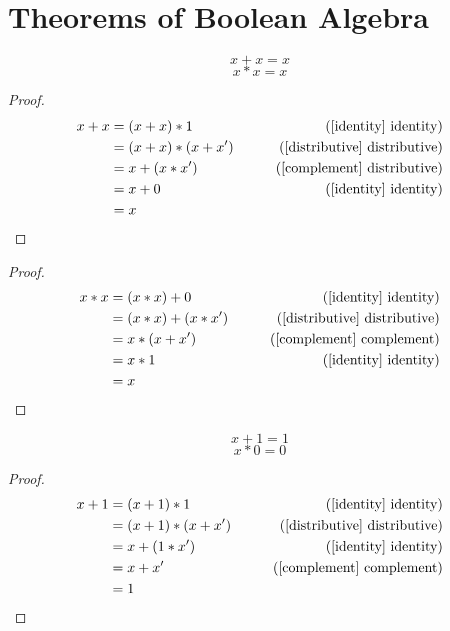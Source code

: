 
\section {Theorems of Boolean Algebra}

\begin{theorem}
\label{idempotent}
\[ x + x = x \]
\[ x * x = x \]
\end{theorem}

\begin{proof}
\begin{align*}
x + x & = (x + x) * 1        & \tag{\ref{identity} identity}\\
      & = (x + x) * (x + x') & \tag{\ref{distributive} distributive} \\
      & = x + (x * x')       & \tag{\ref{complement} distributive} \\
      & = x + 0              & \tag{\ref{identity} identity} \\
      & = x
\end{align*}
\end{proof}

\begin{proof}
\begin{align*}
x * x & = (x * x) + 0        & \tag{\ref{identity} identity} \\
      & = (x * x) + (x * x') & \tag{\ref{distributive} distributive} \\
      & = x * (x + x')       & \tag{\ref{complement} complement} \\
      & = x * 1              & \tag{\ref{identity} identity} \\
      & = x
\end{align*}
\end{proof}

\newpage
\begin{theorem}
\label{boundedness}
\[ x + 1 = 1 \]
\[ x * 0 = 0 \]
\end{theorem}

\begin{proof}
\begin{align*}
x + 1 & = (x + 1) * 1        & \tag{\ref{identity} identity} \\
      & = (x + 1) * (x + x') & \tag{\ref{distributive} distributive} \\
      & = x + (1 * x')       & \tag{\ref{identity} identity} \\
      & = x + x'             & \tag{\ref{complement} complement} \\
      & = 1
\end{align*}
\end{proof}

